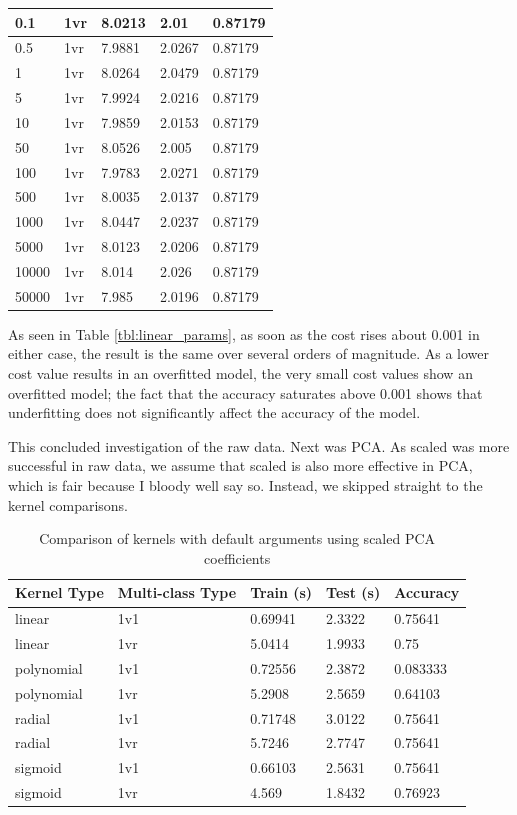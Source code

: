 \documentclass[a4paper, 10pt, conference]{ieeeconf}
\begin{document}
\begin{table}
\begin{tabular}{lllll}
0.1 & 1vr & 8.0213 & 2.01 & 0.87179\\ \hline
0.5 & 1vr & 7.9881 & 2.0267 & 0.87179\\ \hline
1 & 1vr & 8.0264 & 2.0479 & 0.87179\\ \hline
5 & 1vr & 7.9924 & 2.0216 & 0.87179\\ \hline
10 & 1vr & 7.9859 & 2.0153 & 0.87179\\ \hline
50 & 1vr & 8.0526 & 2.005 & 0.87179\\ \hline
100 & 1vr & 7.9783 & 2.0271 & 0.87179\\ \hline
500 & 1vr & 8.0035 & 2.0137 & 0.87179\\ \hline
1000 & 1vr & 8.0447 & 2.0237 & 0.87179\\ \hline
5000 & 1vr & 8.0123 & 2.0206 & 0.87179\\ \hline
10000 & 1vr  & 8.014 & 2.026 & 0.87179\\ \hline
50000 & 1vr  & 7.985 & 2.0196 & 0.87179\\ \hline
\end{tabular}
\end{table}

As seen in Table \ref{tbl:linear_params}, as soon as the cost rises about 0.001 in either case, the result is the same over several orders of magnitude. As a lower cost value results in an overfitted model, the very small cost values show an overfitted model; the fact that the accuracy saturates above 0.001 shows that underfitting does not significantly affect the accuracy of the model.

This concluded investigation of the raw data. Next was PCA. As scaled was more successful in raw data, we assume that scaled is also more effective in PCA, which is fair because I bloody well say so. Instead, we skipped straight to the kernel comparisons.

\begin{table}
\centering
\label{tbl:kernel_pca}
\caption{Comparison of kernels with default arguments using scaled PCA coefficients}
\begin{tabular}{lllll}
Kernel Type & Multi-class Type & Train (s) & Test (s) & Accuracy\\ \hline
linear & 1v1 & 0.69941 & 2.3322 & 0.75641\\ \hline
linear & 1vr & 5.0414 & 1.9933 & 0.75\\ \hline
polynomial & 1v1 & 0.72556 & 2.3872 & 0.083333\\ \hline
polynomial & 1vr & 5.2908 & 2.5659 & 0.64103\\ \hline
radial & 1v1 & 0.71748 & 3.0122 & 0.75641\\ \hline
radial & 1vr & 5.7246 & 2.7747 & 0.75641\\ \hline
sigmoid & 1v1 & 0.66103 & 2.5631 & 0.75641\\ \hline
sigmoid & 1vr & 4.569 & 1.8432 & 0.76923\\ \hline
\end{tabular}
\end{table}
\end{document}
